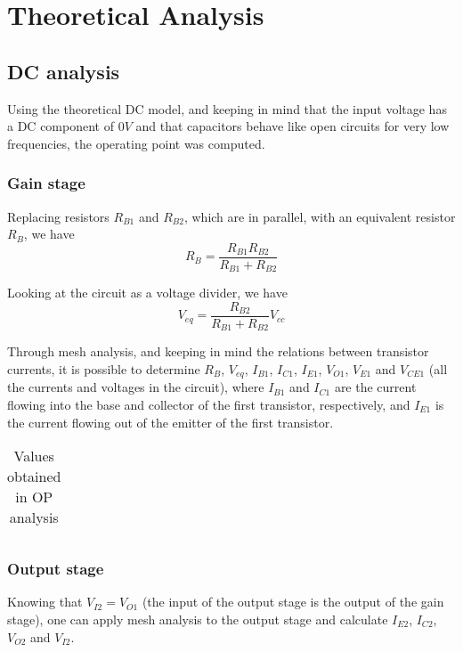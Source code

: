 \section{Theoretical Analysis}
\label{sec:analysis}




\subsection{DC analysis}
Using the theoretical DC model, and keeping in mind that the input voltage has a DC component of $0V$ and that capacitors behave like open circuits for very low frequencies, the operating point was computed.


\subsubsection{Gain stage}
Replacing resistors $R_{B1}$ and $R_{B2}$, which are in parallel, with an equivalent resistor $R_{B}$, we have
\begin{equation}
R_B = \frac{R_{B1} R_{B2}}{R_{B1}+R_{B2}}
\end{equation}

Looking at the circuit as a voltage divider, we have
\begin{equation}
V_{eq} = \frac{R_{B2}}{R_{B1}+R_{B2}} V_{cc}
\end{equation}


Through mesh analysis, and keeping in mind the relations between transistor currents, it is possible to determine $R_B$, $V_{eq}$, $I_{B1}$, $I_{C1}$, $I_{E1}$, $V_{O1}$, $V_{E1}$ and $V_{CE1}$ (all the currents and voltages in the circuit), where $I_{B1}$ and $I_{C1}$ are the current flowing into the base and collector of the first transistor, respectively, and $I_{E1}$ is the current flowing out of the emitter of the first transistor.


\begin{table}[H]
  \centering
  \begin{tabular}{|c|c|}
    \hline
      
  \end{tabular}
  \caption{Values obtained in OP analysis}
  \label{tab:resultsDC1}
\end{table}



\subsubsection{Output stage}
Knowing that $V_{I2}=V_{O1}$ (the input of the output stage is the output of the gain stage), one can apply mesh analysis to the output stage and calculate $I_{E2}$, $I_{C2}$, $V_{O2}$ and $V_{I2}$.

